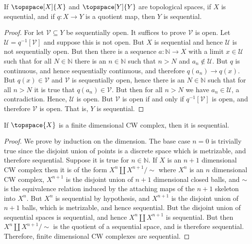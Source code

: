             \begin{theorem}
                If $\topspace[X]{X}$ and $\topspace[Y]{Y}$ are
                topological spaces, if $X$ is sequential, and if
                $q:X\rightarrow{Y}$ is a quotient map, then $Y$ is
                sequential.
            \end{theorem}
            \begin{proof}
                For let $\mathcal{V}\subseteq{Y}$ be sequentially open.
                It suffices to prove $\mathcal{V}$ is open. Let
                $\mathcal{U}=q^{\minus{1}}[\mathcal{V}]$ and suppose
                this is not open. But $X$ is sequential and hence
                $\mathcal{U}$ is not sequentially open. But then there
                is a sequence $a:\mathbb{N}\rightarrow{X}$ with a limit
                $x\in\mathcal{U}$ such that for all $N\in\mathbb{N}$
                there is an $n\in\mathbb{N}$ such that $n>N$ and
                $a_{n}\notin\mathcal{U}$. But $q$ is continuous, and
                hence sequentially continuous, and therefore
                $q(a_{n})\rightarrow{q}(x)$. But $q(x)\in\mathcal{V}$
                and $\mathcal{V}$ is sequentially open, hence there is
                an $N\in\mathbb{N}$ such that for all $n>N$ it is true
                that $q(a_{n})\in\mathcal{V}$. But then for all $n>N$ we
                have $a_{n}\in\mathcal{U}$, a contradiction. Hence,
                $\mathcal{U}$ is open. But $\mathcal{V}$ is open if and
                only if $q^{\minus{1}}[\mathcal{V}]$ is open, and
                therefore $\mathcal{V}$ is open. That is, $Y$ is
                sequential.
            \end{proof}
            \begin{theorem}
                If $\topspace{X}$ is a finite dimensional CW complex,
                then it is sequential.
            \end{theorem}
            \begin{proof}
                We prove by induction on the dimension. The base case
                $n=0$ is trivially true since the disjoint union of
                points is a discrete space which is metrizable, and
                therefore sequential. Suppose it is true for
                $n\in\mathbb{N}$. If $X$ is an $n+1$ dimensional CW
                complex then it is of the form $X^{n}\coprod{X}^{n+1}/\sim$
                where $X^{n}$ is an $n$ dimensional CW complex, $X^{n+1}$
                is the disjoint union of $n+1$ dimensional closed balls,
                and $\sim$ is the equivalence relation induced by the
                attaching maps of the $n+1$ skeleton into $X^{n}$. But
                $X^{n}$ is sequential by hypothesis, and $X^{n+1}$ is
                the disjoint union of $n+1$ balls, which is metrizable,
                and hence sequential. But the disjoint union of
                sequential spaces is sequential, and hence
                $X^{n}\coprod{X}^{n+1}$ is sequential. But then
                $X^{n}\coprod{X}^{n+1}/\sim$ is the quotient of a
                sequential space, and is therefore sequential. Therefore,
                finite dimensional CW complexes are sequential.
            \end{proof}
